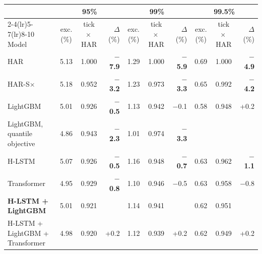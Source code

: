 \begin{tabular}{@{}lccrccrccr@{}}
\toprule
 & \multicolumn{3}{c}{95\%} & \multicolumn{3}{c}{99\%} & \multicolumn{3}{c}{99.5\%} \\
\cmidrule(lr){2-4}\cmidrule(lr){5-7}\cmidrule(lr){8-10}
Model & exc. (\%) & tick $\times$\,HAR & $\Delta$ (\%) & exc. (\%) & tick $\times$\,HAR & $\Delta$ (\%) & exc. (\%) & tick $\times$\,HAR & $\Delta$ (\%) \\
\midrule
HAR & 5.13 & 1.000 & \textbf{$-$7.9} & 1.29 & 1.000 & \textbf{$-$5.9} & 0.69 & 1.000 & \textbf{$-$4.9} \\
HAR-S$\times$ & 5.18 & 0.952 & \textbf{$-$3.2} & 1.23 & 0.973 & \textbf{$-$3.3} & 0.65 & 0.992 & \textbf{$-$4.2} \\
LightGBM & 5.01 & 0.926 & \textbf{$-$0.5} & 1.13 & 0.942 & $-$0.1 & 0.58 & 0.948 & +0.2 \\
LightGBM, quantile objective & 4.86 & 0.943 & \textbf{$-$2.3} & 1.01 & 0.974 & \textbf{$-$3.3} &  &  &  \\
H-LSTM & 5.07 & 0.926 & \textbf{$-$0.5} & 1.16 & 0.948 & \textbf{$-$0.7} & 0.63 & 0.962 & \textbf{$-$1.1} \\
Transformer & 4.95 & 0.929 & \textbf{$-$0.8} & 1.10 & 0.946 & $-$0.5 & 0.63 & 0.958 & $-$0.8 \\
\textbf{H-LSTM + LightGBM} & 5.01 & 0.921 &  & 1.14 & 0.941 &  & 0.62 & 0.951 &  \\
H-LSTM + LightGBM + Transformer & 4.98 & 0.920 & +0.2 & 1.12 & 0.939 & +0.2 & 0.62 & 0.949 & +0.2 \\
\bottomrule
\end{tabular}
